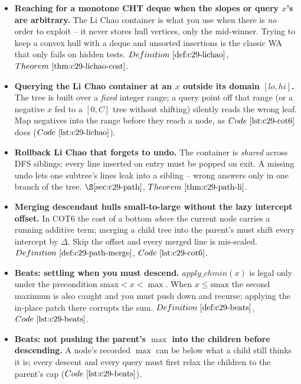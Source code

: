 
\begin{itemize}[nosep, leftmargin=1.4em]
  \item \textbf{Reaching for a monotone CHT deque when the slopes or query \(x\)'s are
        arbitrary.} The Li Chao container is what you use when there is \emph{no} order to
        exploit -- it never stores hull vertices, only the mid-winner. Trying to keep a convex
        hull with a deque and unsorted insertions is the classic WA that only fails on hidden
        tests. \(\defref{c29-lichao}\), \(\thmref{c29-lichao-cost}\).
  \item \textbf{Querying the Li Chao container at an \(x\) outside its domain \([lo,hi]\).} The
        tree is built over a \emph{fixed} integer range; a query point off that range (or a
        negative \(x\) fed to a \([0,C]\) tree without shifting) silently reads the wrong leaf.
        Map negatives into the range before they reach a node, as \(\coderef{c29-cot6}\) does
        (\(\coderef{c29-lichao}\)).
  \item \textbf{Rollback Li Chao that forgets to undo.} The container is \emph{shared} across DFS
        siblings; every line inserted on entry must be popped on exit. A missing undo lets one
        subtree's lines leak into a sibling -- wrong answers only in one branch of the tree.
        \(\secref{c29-path}\), \(\thmref{c29-path-li}\).
  \item \textbf{Merging descendant hulls small-to-large without the lazy intercept offset.} In
        COT6 the cost of a bottom \emph{above} the current node carries a running additive term;
        merging a child tree into the parent's must shift every intercept by \(\Delta\). Skip the
        offset and every merged line is mis-scaled. \(\defref{c29-path-merge}\), \(\coderef{c29-cot6}\).
  \item \textbf{Beats: settling when you must descend.} \(\mathit{apply\_chmin}(x)\) is legal only
        under the precondition \(\mathrm{smax}<x<\max\). When \(x\le\mathrm{smax}\) the second
        maximum is also caught and you must push down and recurse; applying the in-place patch
        there corrupts the sum. \(\defref{c29-beats}\), \(\coderef{c29-beats}\).
  \item \textbf{Beats: not pushing the parent's \(\max\) into the children before descending.} A
        node's recorded \(\max\) can be below what a child still thinks it is; every descent and
        every query must first relax the children to the parent's cap (\(\coderef{c29-beats}\)).

\end{itemize}
